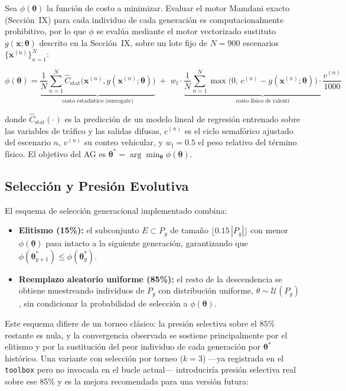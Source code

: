 \documentclass[12pt,a4paper]{article}
\begin{document}
Sea $\phi(\boldsymbol{\theta})$ la función de costo a minimizar. Evaluar
el motor Mamdani exacto (Sección~IX) para cada individuo de cada
generación es computacionalmente prohibitivo, por lo que $\phi$ se evalúa
mediante el motor vectorizado sustituto $g(\mathbf{x};\boldsymbol{\theta})$
descrito en la Sección~IX, sobre un lote fijo de $N=900$ escenarios
$\{\mathbf{x}^{(n)}\}_{n=1}^{N}$:

\begin{equation}
\phi(\boldsymbol{\theta}) = \underbrace{\frac{1}{N}\sum_{n=1}^{N} \hat{C}_{\text{stat}}\big(\mathbf{x}^{(n)}, g(\mathbf{x}^{(n)};\boldsymbol{\theta})\big)}_{\text{costo estadístico (surrogate)}}
\;+\; w_{\text{f}} \cdot \underbrace{\frac{1}{N}\sum_{n=1}^{N} \max\big(0,\, c^{(n)} - g(\mathbf{x}^{(n)};\boldsymbol{\theta})\big)\cdot \frac{v^{(n)}}{1000}}_{\text{costo físico de ralentí}}
\end{equation}

donde $\hat{C}_{\text{stat}}(\cdot)$ es la predicción de un modelo
lineal de regresión entrenado sobre las variables de tráfico y las
salidas difusas, $c^{(n)}$ es el ciclo semafórico ajustado del escenario
$n$, $v^{(n)}$ su conteo vehicular, y $w_{\text{f}}=0.5$ el peso relativo
del término físico. El objetivo del AG es
$\boldsymbol{\theta}^{*} = \arg\min_{\boldsymbol{\theta}} \phi(\boldsymbol{\theta})$.

\subsection{Selección y Presión Evolutiva}

El esquema de selección generacional implementado combina:

\begin{itemize}
 \item \textbf{Elitismo (15\%):} el subconjunto
 $E \subset P_g$ de tamaño $\lfloor 0.15 \, |P_g| \rfloor$ con menor
 $\phi(\boldsymbol{\theta})$ pasa intacto a la siguiente generación,
 garantizando que $\phi(\boldsymbol{\theta}^{*}_{g+1}) \le \phi(\boldsymbol{\theta}^{*}_{g})$.
 \item \textbf{Reemplazo aleatorio uniforme (85\%):} el resto de la
 descendencia se obtiene muestreando individuos de $P_g$ con
 distribución uniforme, $\theta \sim \mathcal{U}(P_g)$, sin
 condicionar la probabilidad de selección a $\phi(\boldsymbol{\theta})$.
\end{itemize}

Este esquema difiere de un torneo clásico: la presión selectiva sobre
el $85\%$ restante es nula, y la convergencia observada se sostiene
principalmente por el elitismo y por la sustitución del peor individuo
de cada generación por $\boldsymbol{\theta}^{*}$ histórico. Una variante
con selección por torneo ($k=3$) —ya registrada en el \texttt{toolbox}
pero no invocada en el bucle actual— introduciría presión selectiva
real sobre ese 85\% y es la mejora recomendada para una versión futura:
\end{document}
